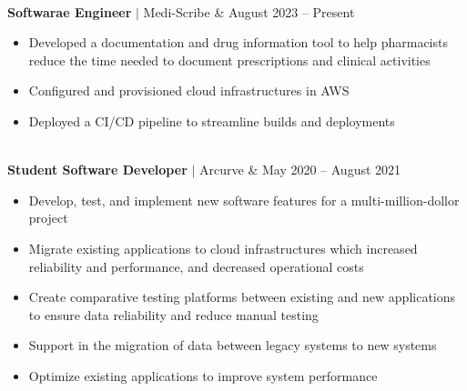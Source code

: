 \documentclass[11pt]{article}
\newenvironment{compactList}
{
  \begin{itemize}
    \setlength{\itemsep}{0pt}
    \setlength{\parskip}{0pt}
}
{\end{itemize}}
\begin{document}
\begin{tabularx}{\textwidth\setlength{\extrarowheight}{5pt}}
{\begin{minipage}{0.85\paperwidth}
    \end{minipage}
  }
  \\
  \textbf{Softwarae Engineer} $\vert$ Medi-Scribe               & August 2023 – Present \\
  {
    \begin{minipage}{0.85\paperwidth}
      \begin{compactList}
        \item Developed a documentation and drug information tool to help pharmacists reduce the time needed to document prescriptions and clinical activities
        \item Configured and provisioned cloud infrastructures in AWS
        \item Deployed a CI/CD pipeline to streamline builds and deployments
      \end{compactList}
    \end{minipage}
  }
  \\
  \textbf{Student Software Developer} $\vert$ Arcurve                     & May 2020 – August 2021 \\
  {
    \begin{minipage}{0.85\paperwidth}
      \begin{compactList}
        \item Develop, test, and implement new software features for a multi-million-dollor project
        \item Migrate existing applications to cloud infrastructures which increased reliability and performance, and decreased operational costs
        \item Create comparative testing platforms between existing and new applications to ensure data reliability and reduce manual testing
        \item Support in the migration of data between legacy systems to new systems
        \item Optimize existing applications to improve system performance
      \end{compactList}
    \end{minipage}
  }
\end{tabularx}
\vspace{-10pt}
\end{document}
